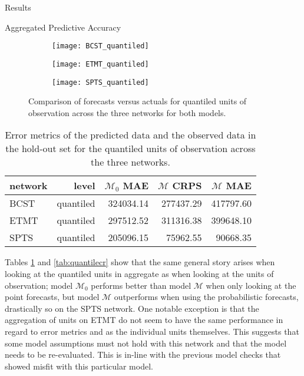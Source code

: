 \begin{chapter}{Results}
\begin{section}{Aggregated Predictive Accuracy}
    \begin{figure}[!h]
      \centering
      \begin{subfigure}[b]{.75\textwidth}
        \centering
        \texttt{[image: BCST\_quantiled]}
      \end{subfigure}
      \begin{subfigure}[b]{.75\textwidth}
        \centering
        \texttt{[image: ETMT\_quantiled]}
      \end{subfigure}
      \begin{subfigure}[b]{.75\textwidth}
        \centering
        \texttt{[image: SPTS\_quantiled]}
      \end{subfigure}
      \caption{Comparison of forecasts versus actuals for quantiled units of observation across the three networks
        for both models.}
      \label{fig:quantiledoutcomes}
    \end{figure}

    \begin{table}[h!]
      \centering
        \begin{tabular}{lrrrr}
          network & level & $\mathcal{M}_0$ MAE & $\mathcal{M}$ CRPS & $\mathcal{M}$ MAE \\
          \hline
          BCST & quantiled & 324034.14 & 277437.29 & 417797.60 \\
          ETMT & quantiled & 297512.52 & 311316.38 & 399648.10 \\
          SPTS & quantiled & 205096.15 & 75962.55 & 90668.35
        \end{tabular}
      \caption{Error metrics of the predicted data and the observed data in the hold-out set for the quantiled
        units of observation across the three networks.}\label{tab:quantileerror}
    \end{table}

    Tables \ref{tab:quantileerror} and \ref{tab:quantilecr} show that the same general story arises when looking at the
    quantiled units in aggregate as when looking at the units of observation; model $\mathcal{M}_0$ performs better
    than model $\mathcal{M}$ when only looking at the point forecasts, but model $\mathcal{M}$ outperforms
    when using the probabilistic forecasts, drastically so on the SPTS network.
    One notable exception is that the aggregation of units on ETMT do not seem to have the same performance
    in regard to error metrics and as the individual units themselves. This suggests that some
    model assumptions must not hold with this network and that the model needs to be re-evaluated.
    This is in-line with the previous model checks that showed misfit with this particular model.


\end{section}
\end{chapter}
